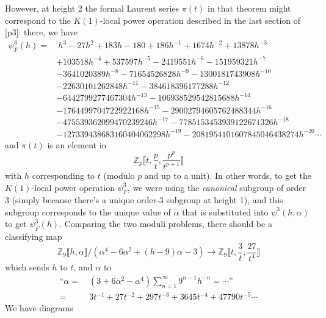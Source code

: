 \documentclass{rs}
\theoremstyle{definition}
\theoremstyle{remark}
\newcommand{\mb}[1]{\mathbb{#1}}
\newcommand{\BZ}{{\mb Z}}
\newcommand{\A}{\alpha}
\newcommand{\p}{\psi^3}
\newcommand{\lb}{\llbracket}
\newcommand{\rb}{\rrbracket}
\renewcommand{\=}{\approx}
\renewcommand{\-}{\sim}
\numberwithin{equation}{section}
\numberwithin{thm}{section}
\begin{document}
However, at height 2 the formal Laurent series $\pi(t)$ in that theorem might correspond to the $K(1)$-local power operation described in the last section of [p3]: 
there, we have 
\begin{equation}
\label{h}
 \begin{split}
  \p_F(h) = & ~ h^3 - 27 h^2 + 183 h - 180 + 186 h^{-1} + 1674 h^{-2} + 13878 h^{-3} \\
            & + 103518 h^{-4} + 537597 h^{-5} - 2419551 h^{-6} - 151959321 h^{-7} \\
            & - 3641020389 h^{-8} - 71654526828 h^{-9} - 1300181743908 h^{-10} \\
            & - 22630101262848 h^{-11} - 384618396177288 h^{-12} \\
            & - 6442799277467304 h^{-13} - 106938529542815688 h^{-14} \\
            & - 1764499704722922168 h^{-15} - 29002794605762488344 h^{-16} \\
            & - 475539362099470239246 h^{-17} - 7785153453939122671326 h^{-18} \\
            & - 127339438683160404062298 h^{-19} - 2081954101607845046438274 h^{-20} \cdots 
 \end{split}
\end{equation}
and $\pi(t)$ is an element in 
\[
 \BZ_p \lb t, \frac{p}{t}, \frac{p^p}{t^{p+1}} \rb 
\]
with $h$ corresponding to $t$ (modulo $p$ and up to a unit).  
In other words, to get the $K(1)$-local power operation $\p_F$, we were using the {\em canonical} subgroup of order 3 
(simply because there's a unique order-3 subgroup at height 1), 
and this subgroup corresponds to the unique value of $\A$ that is substituted into $\p(h;\A)$ to get $\p_F(h)$.  
Comparing the two moduli problems, there should be a classifying map 
\[
 \BZ_9 \llbracket h, \A \rrbracket / (\A^4 - 6 \A^2 + (h - 9) \A - 3) \to \BZ_9 \llbracket t, \frac{3}{t}, \frac{27}{t^4} \rrbracket 
\]
which sends $h$ to $t$, and $\A$ to 
\begin{equation*}
 \begin{split}
  \text{``}\A = & ~ (3 + 6 \A^2 - \A^4) \sum_{n=1}^\infty 9^{n-1} h^{-n} = \cdots \text{''} \\
              = & ~ 3 t^{-1} + 27 t^{-2} + 297 t^{-3} + 3645 t^{-4} + 47790 t^{-5} \cdots 
 \end{split}
\end{equation*}
We have diagrams 
\end{document}
